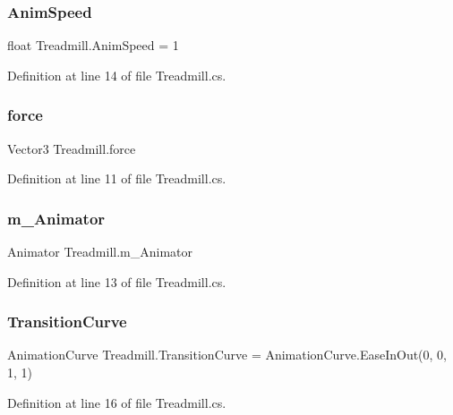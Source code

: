 \subsubsection{\texorpdfstring{Anim\+Speed}{AnimSpeed}}
{\footnotesize\ttfamily float Treadmill.\+Anim\+Speed = 1}



Definition at line 14 of file Treadmill.\+cs.

\mbox{\label{class_treadmill_ad1f6f91c2b11468633c46dffc69df3ec}} 
\subsubsection{\texorpdfstring{force}{force}}
{\footnotesize\ttfamily Vector3 Treadmill.\+force}



Definition at line 11 of file Treadmill.\+cs.

\mbox{\label{class_treadmill_a944a58130156daeb07358a4545838e08}} 
\subsubsection{\texorpdfstring{m\+\_\+\+Animator}{m\_Animator}}
{\footnotesize\ttfamily Animator Treadmill.\+m\+\_\+\+Animator}



Definition at line 13 of file Treadmill.\+cs.

\mbox{\label{class_treadmill_aa5870c200080e8bf45c917fe498c8b1a}} 
\subsubsection{\texorpdfstring{Transition\+Curve}{TransitionCurve}}
{\footnotesize\ttfamily Animation\+Curve Treadmill.\+Transition\+Curve = Animation\+Curve.\+Ease\+In\+Out(0, 0, 1, 1)}



Definition at line 16 of file Treadmill.\+cs.

\mbox{\label{class_treadmill_a53d31f1368cf547ff9a4ee4c8650484e}} 
